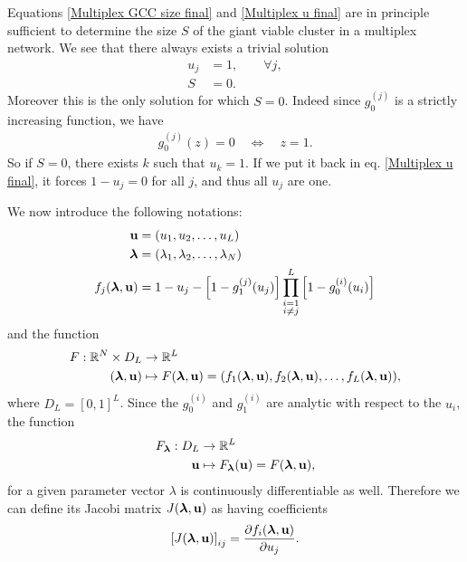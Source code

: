 \documentclass[
11pt, %
english, %
singlespacing, %
liststotoc, %
headsepline, %
]{MastersDoctoralThesis} %
\begin{document}
Equations \eqref{Multiplex GCC size final} and \eqref{Multiplex u final} are in principle sufficient to determine the size $S$ of the giant viable cluster in a multiplex network. We see that there always exists a trivial solution
\begin{align}
	u_j &= 1, \qquad \forall j,\\
	S &= 0.
\end{align}
Moreover this is the only solution for which $S = 0$. Indeed since $g_0^{(j)}$ is a strictly increasing function, we have
\begin{align}
	g_0^{(j)}(z) = 0 \quad \Leftrightarrow \quad z = 1.
\end{align}
So if $S = 0$, there exists $k$ such that $u_k = 1$. If we put it back in eq. \eqref{Multiplex u final}, it forces $1 - u_j = 0$ for all $j$, and thus all $u_j$ are one.


We now introduce the following notations:
\begin{align}
	\boldsymbol{\mathrm{u}} &= (u_1, u_2, \dots, u_L) \\
	\boldsymbol{\mathrm{\lambda}} &= (\lambda_1, \lambda_2, \dots, \lambda_N) \\
	f_j(\boldsymbol{\mathrm{\lambda}}, \boldsymbol{\mathrm{u}}) &= 1 - u_j - \left[1 - g_1^{(j)}(u_j) \right] \prod_{\substack{i = 1 \\ i \neq j}}^{L}  \left[1 - g_0^{(i)}(u_i) \right] \label{Definition fj}
\end{align}
and the function
\begin{align}
	F : \mathbb{R}^N \times D_L &\rightarrow \mathbb{R}^L \\
	(\boldsymbol{\mathrm{\lambda}}, \boldsymbol{\mathrm{u}}) &\mapsto F(\boldsymbol{\mathrm{\lambda}}, \boldsymbol{\mathrm{u}}) = (f_1(\boldsymbol{\mathrm{\lambda}}, \boldsymbol{\mathrm{u}}), f_2(\boldsymbol{\mathrm{\lambda}}, \boldsymbol{\mathrm{u}}), \dots, f_L(\boldsymbol{\mathrm{\lambda}}, \boldsymbol{\mathrm{u}})), \label{Definition F}
\end{align}
where $D_L = [0, 1]^L$. Since the $g_0^{(i)}$ and $g_1^{(i)}$ are analytic with respect to the $u_i$, the function
\begin{align}
	F_{\boldsymbol{\mathrm{\lambda}}} : D_L &\rightarrow \mathbb{R}^L\\
		\boldsymbol{\mathrm{u}} &\mapsto F_{\boldsymbol{\mathrm{\lambda}}}(\boldsymbol{\mathrm{u}}) = F(\boldsymbol{\mathrm{\lambda}}, \boldsymbol{\mathrm{u}}),
\end{align}
for a given parameter vector $\lambda$ is continuously differentiable as well. Therefore we can define its Jacobi matrix $J(\boldsymbol{\mathrm{\lambda}}, \boldsymbol{\mathrm{u}})$ as having coefficients
\begin{align}
	\left[ J(\boldsymbol{\mathrm{\lambda}}, \boldsymbol{\mathrm{u}}) \right]_{ij} = \frac{\partial f_i(\boldsymbol{\mathrm{\lambda}},\boldsymbol{\mathrm{u}})}{\partial u_j}.
\end{align}
\end{document}
